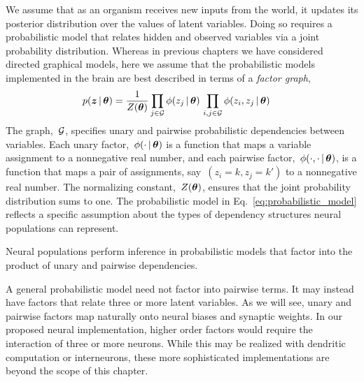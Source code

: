 We assume that as an organism receives new inputs from the world, it
updates its posterior distribution over the values of latent
variables. Doing so requires a probabilistic model that relates hidden
and observed variables via a joint probability distribution.  Whereas
in previous chapters we have considered directed graphical models,
here we assume that the probabilistic models implemented in the brain
are best described in terms of a \emph{factor graph},
\begin{align}
  \label{eq:probabilistic_model}
  p(\boldsymbol{z} \,|\, \boldsymbol{\theta}) &=
  \frac{1}{Z(\boldsymbol{\theta})}
  \prod_{j \in \mathcal{G}} \phi(z_j \,|\, \boldsymbol{\theta}) \,
  \prod_{i,j \in \mathcal{G}} \phi(z_i, z_j \,|\, \boldsymbol{\theta}) \,
\end{align}
The graph,~$\mathcal{G}$, specifies unary and pairwise
probabilistic dependencies between variables.  Each unary factor,~$\phi(\cdot \,|\,
\boldsymbol{\theta})$ is a function that maps a variable assignment to a
nonnegative real number, and each pairwise factor,~$\phi(\cdot, \cdot
\,|\, \boldsymbol{\theta})$, is a function that maps a pair of assignments,
say~${(z_i=k, z_j=k')}$ to a nonnegative real number. The
normalizing constant,~$Z(\boldsymbol{\theta})$, ensures that the joint probability
distribution sums to one.
The probabilistic model in Eq.~\ref{eq:probabilistic_model} reflects
a specific assumption about the types of dependency structures
neural populations can represent.

\begin{assumption}
  Neural populations perform inference in probabilistic models
  that factor into the product of unary and pairwise dependencies. 
\end{assumption}

A general probabilistic model need not factor into pairwise terms. It may instead
have factors that relate three or more latent variables. As we will
see, unary and pairwise factors map naturally onto neural biases
and synaptic weights. In our proposed neural implementation, higher
order factors would require the interaction of three or more neurons.
While this may be realized with dendritic computation or interneurons,
these more sophisticated implementations are beyond the scope of this
chapter. 

